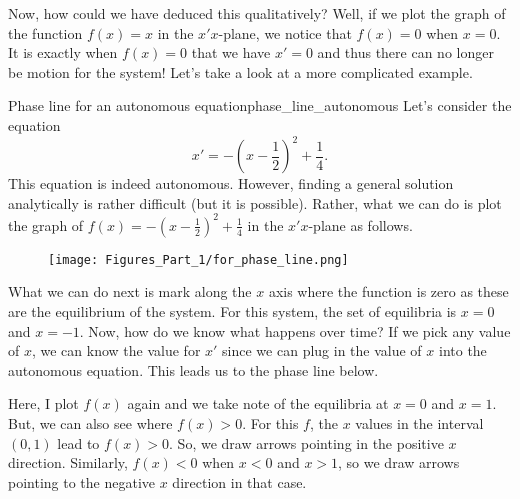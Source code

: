                 Now, how could we have deduced this qualitatively? Well, if we plot the graph of the function $f(x)=x$ in the $x'x$-plane, we notice that $f(x)=0$ when $x=0$.  It is exactly when $f(x)=0$ that we have $x'=0$ and thus there can no longer be motion for the system! Let's take a look at a more complicated example.



                \begin{ex}{Phase line for an autonomous equation}{phase_line_autonomous}
                Let's consider the equation
                \[
                x' = -\left(x-\frac{1}{2}\right)^2+\frac{1}{4}.
                \]
                This equation is indeed autonomous. However, finding a general solution analytically is rather difficult (but it is possible).  Rather, what we can do is plot the graph of $f(x)=-\left(x-\frac{1}{2}\right)^2+\frac{1}{4}$ in the $x'x$-plane as follows.
                \begin{figure}[H]
                    \centering
                    \texttt{[image: Figures\_Part\_1/for\_phase\_line.png]}
                \end{figure}
                What we can do next is mark along the $x$ axis where the function is zero as these are the equilibrium of the system. For this system, the set of equilibria is $x=0$ and $x=-1$. Now, how do we know what happens over time? If we pick any value of $x$, we can know the value for $x'$ since we can plug in the value of $x$ into the autonomous equation.  This leads us to the phase line below.

                \begin{centering}
                \end{centering}

                Here, I plot $f(x)$ again and we take note of the equilibria at $x=0$ and $x=1$. But, we can also see where $f(x)>0$. For this $f$, the $x$ values in the interval $(0,1)$ lead to $f(x)>0$.  So, we draw arrows pointing in the positive $x$ direction. Similarly, $f(x)<0$ when $x<0$ and $x>1$, so we draw arrows pointing to the negative $x$ direction in that case.


\end{ex}
